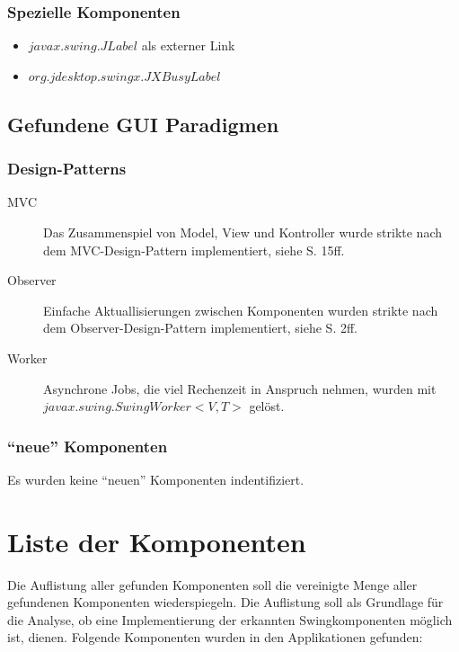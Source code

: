   \subsubsection{Spezielle Komponenten}
    
  \begin{itemize}
    \item \(javax.swing.JLabel\) als externer Link
    \item \(org.jdesktop.swingx.JXBusyLabel\)
  \end{itemize}
  
  \subsection{Gefundene GUI Paradigmen}
    
  \subsubsection{Design-Patterns}
  
  \begin{description}
    \item[MVC]
    Das Zusammenspiel von Model, View und Kontroller wurde strikte nach dem
    MVC-Design-Pattern implementiert, siehe \cite{GUIDesignPatterns} S. 15ff.
    \item[Observer]
    Einfache Aktuallisierungen zwischen Komponenten wurden strikte nach dem
    Observer-Design-Pattern implementiert, siehe \cite{GUIDesignPatterns} S.
    2ff.
    \item[Worker]
    Asynchrone Jobs, die viel Rechenzeit in Anspruch nehmen, wurden mit
    \(javax.swing.SwingWorker<V,T>\) gelöst.
  \end{description}
  
  \subsubsection{``neue'' Komponenten}
  
  Es wurden keine ``neuen'' Komponenten indentifiziert.
  
  \section{Liste der Komponenten}
  
  Die Auflistung aller gefunden Komponenten soll die vereinigte Menge aller
  gefundenen Komponenten wiederspiegeln. Die Auflistung soll als Grundlage für
  die Analyse, ob eine Implementierung der erkannten Swingkomponenten möglich
  ist, dienen. Folgende Komponenten wurden in den Applikationen gefunden:
  
